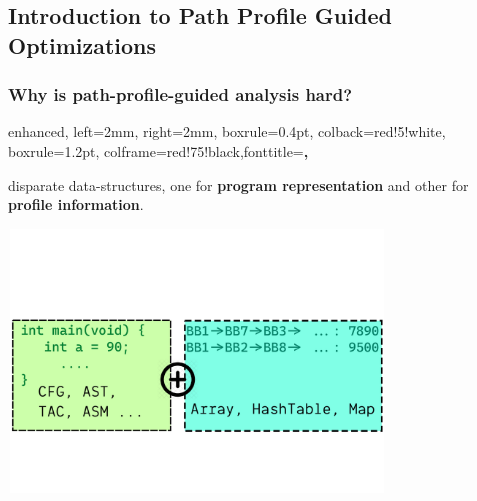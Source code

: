 \documentclass[aspectratio=169, compress]{beamer}
\begin{document}
\subsection{Introduction to Path Profile Guided Optimizations}
{
	
}
\begin{frame}
	\frametitle{Why is path-profile-guided analysis hard?}
	\tcbset
	{
		enhanced,
		left=2mm,
		right=2mm,
		boxrule=0.4pt,
		colback=red!5!white,
		boxrule=1.2pt,
		colframe=red!75!black,fonttitle=\bfseries,
	}
	\begin{tcolorbox}[colback=red!3!white,colframe=red!50!black,lifted shadow={1mm}{-2mm}{3mm}{0.1mm}{black!50!white}]
	disparate data-structures, one for \textbf{program representation} and other for \textbf{profile information}.
	\end{tcolorbox}
	\centering
	\includegraphics[width=10cm, height=7cm]{dotfiles/docs.pdf}
\end{frame}
{
	
}
{
	
}
\end{document}
